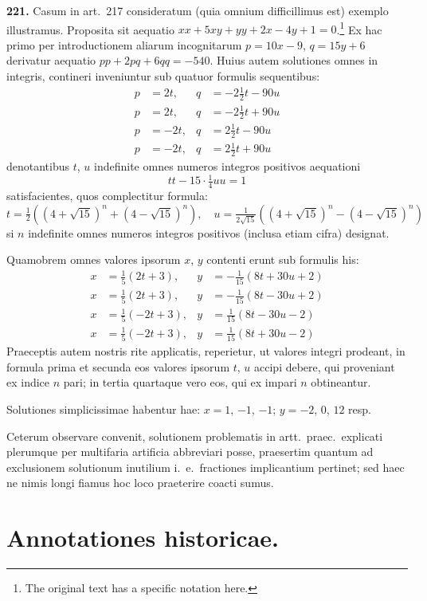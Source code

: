 \documentclass[12pt,a4paper]{article}
\theoremstyle{plain}
\theoremstyle{definition}
\theoremstyle{remark}
\begin{document}
\textbf{221.}
Casum in art.\ 217 consideratum (quia omnium difficillimus est) exemplo illustramus. Proposita sit aequatio $x\!\!x+5xy+yy+2x-4y+1=0$.\footnote{The original text has a specific notation here.} Ex hac primo per introductionem aliarum incognitarum $p=10x-9$, $q=15y+6$ derivatur aequatio $pp+2pq+6qq=-540$. Huius autem solutiones omnes in integris, contineri inveniuntur sub quatuor formulis sequentibus:
\begin{align*}
p &= 2t, & q &= -2\tfrac{1}{2}t-90u \\
p &= 2t, & q &= -2\tfrac{1}{2}t+90u \\
p &= -2t, & q &= 2\tfrac{1}{2}t-90u \\
p &= -2t, & q &= 2\tfrac{1}{2}t+90u
\end{align*}
denotantibus $t$, $u$ indefinite omnes numeros integros positivos aequationi
\[
tt-15\cdot\tfrac{1}{4}uu=1
\]
satisfacientes, quos complectitur formula:
\[
t=\tfrac{1}{2}\left(\left(4+\sqrt{15}\right)^n+\left(4-\sqrt{15}\right)^n\right),\quad u=\tfrac{1}{2\sqrt{15}}\left(\left(4+\sqrt{15}\right)^n-\left(4-\sqrt{15}\right)^n\right)
\]
si $n$ indefinite omnes numeros integros positivos (inclusa etiam cifra) designat.

Quamobrem omnes valores ipsorum $x$, $y$ contenti erunt sub formulis his:
\begin{align*}
x &= \tfrac{1}{5}(2t+3), & y &= -\tfrac{1}{15}(8t+30u+2) \\
x &= \tfrac{1}{5}(2t+3), & y &= -\tfrac{1}{15}(8t-30u+2) \\
x &= \tfrac{1}{5}(-2t+3), & y &= \tfrac{1}{15}(8t-30u-2) \\
x &= \tfrac{1}{5}(-2t+3), & y &= \tfrac{1}{15}(8t+30u-2)
\end{align*}
Praeceptis autem nostris rite applicatis, reperietur, ut valores integri prodeant, in formula prima et secunda eos valores ipsorum $t$, $u$ accipi debere, qui proveniant ex indice $n$ pari; in tertia quartaque vero eos, qui ex impari $n$ obtineantur.

Solutiones simplicissimae habentur hae: $x=1$, $-1$, $-1$; $y=-2$, $0$, $12$ resp.

Ceterum observare convenit, solutionem problematis in artt.\ praec.\ explicati plerumque per multifaria artificia abbreviari posse, praesertim quantum ad exclusionem solutionum inutilium i.\ e.\ fractiones implicantium pertinet; sed haec ne nimis longi fiamus hoc loco praeterire coacti sumus.


\section*{Annotationes historicae.}
\end{document}
